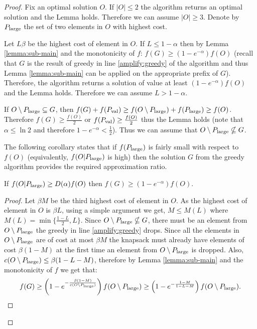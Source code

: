 \documentclass[a4paper,UKenglish,cleveref, autoref]{lipics-v2019}
\begin{document}
\begin{proof}

	Fix an optimal solution $O$.
	 If $|O|\leq 2$ the algorithm returns an optimal solution and the Lemma holds.
	Therefore we can assume $|O| \geq 3$.  Denote by $P_{\text{large}}$ the set of  two  elements in $O$ with highest cost.
	
	Let $L\beta$ be the highest cost of element in $O$.  If $L\leq 1-\alpha$ then
	by Lemma \ref{lemma:sub-main} and the monotonicity of $f$: $f(G) \geq (1-e^{-\alpha}) f(O)$  (recall that $G$ is the result of
	greedy in line \ref{amplify:greedy} of the algorithm and thus Lemma \ref{lemma:sub-main} can be applied on the appropriate prefix of $G$). Therefore, the algorithm
	returns a solution of value at least $(1-e^{-\alpha})f(O)$ and the Lemma holds. Therefore we can assume  $L> 1-\alpha$.
%
	
	If $O\setminus P_{\text{large}} \subseteq G$, then
	$f(G)+ f(P_{\text{val}})\geq f(O\setminus P_{\text{large}}) + f(P_{\text{large}}) \geq f(O)$.
	Therefore $f(G)\geq \frac{f(O)}{2}$ or $f(P_{\text{val}})\geq \frac{f(O)}{2}$
	thus the Lemma holds (note that $\alpha \leq \ln 2$ and therefore
	$1-e^{-\alpha} < \frac{1}{2}$). Thus we can assume that
	$O\setminus P_{\text{large}} \nsubseteq G$.
	
	The following corollary states that if $f(P_{\text{large}})$ is fairly small
	with respect to $f(O)$ (equivalently, $f(O|P_{\text{large}})$ is high) then the solution $G$ from the greedy algorithm provides
	the required approximation ratio.
	
	\begin{corollary}
		\label{corollary:cor1}
	If $f(O|P_{\text{large}}) \geq D(\alpha) f(O)$ then $f(G)\geq (1-e^{-\alpha})f(O)$.
	\end{corollary}

\begin{proof}
	

	Let $\beta M$ be the third highest cost of element in  $O$.
	As the highest cost of  element in $O$ is $\beta L$,
	using a simple argument we get, $M\leq M(L)$ where $M(L)= \min \{\frac{1-L}{2}, L\}$. Since
	$O\setminus P_{\text{large}} \nsubseteq G$, there must be an element from $O \setminus P_{\text{large}}$ the greedy in line \ref{amplify:greedy} drops. Since all the elements
	in $O\setminus P_{\text{large}}$ are of cost at most $\beta M$ the knapsack must
	already have elements of cost $\beta (1-M)$ at the first time an element from $O\setminus P_{\text{large}}$ is dropped. Also, $c(O\setminus P_{\text{large}}) \leq \beta(1-L -M)$, therefore by Lemma \ref{lemma:sub-main} and the monotonicity of $f$ we get that:
  	$$f(G)\geq \left(1-e^{- \frac{\beta (1-M) }{c(O\setminus P_{\text{large}})}}\right) f(O\setminus P_{\text{large}})
  			\geq \left(1-e^{- \frac{1-M }{1-L-M}}\right) f(O\setminus P_{\text{large}}) .$$
  			

\end{proof}
\end{proof}
\end{document}
